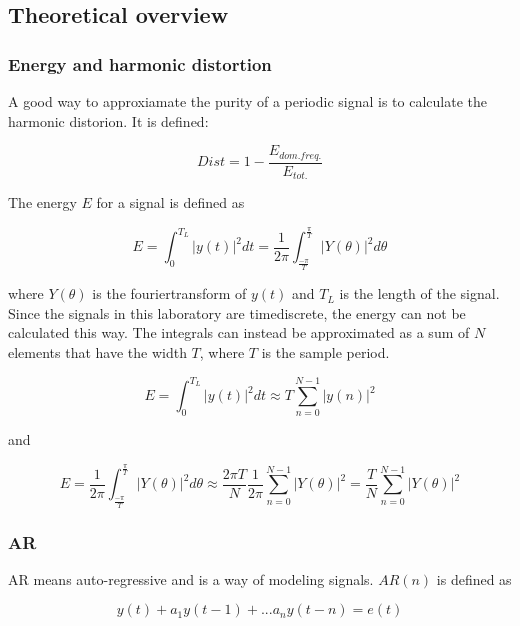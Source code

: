 \documentclass[12pt]{article}
\begin{document}
\subsection{Theoretical overview}

\subsubsection{Energy and harmonic distortion}
A good way to approxiamate the purity of a periodic signal is to calculate the harmonic distorion. It is defined:

\begin{equation}Dist = 1-\frac{E_{dom. freq.}}{E_{tot.}}\end{equation}

The energy $E$ for a signal is defined as

\begin{equation}E=\int_{0}^{T_{L}} \vert y(t)\vert ^2 dt=\frac{1}{2\pi}\int_{\frac{-\pi}{T}}^{\frac{\pi}{T}}\vert Y(\theta)\vert ^2d\theta \end{equation}

where $Y(\theta)$ is the fouriertransform of $y(t)$ and $T_L$ is the length of the signal. Since the signals in this laboratory are timediscrete, the energy can not be calculated this way. The integrals can instead be approximated as a sum of $N$ elements that have the width $T$, where $T$ is the sample period.

\begin{equation}
E=\int_{0}^{T_{L}} \vert y(t)\vert^2 dt\approx T\sum_{n=0}^{N-1}\vert y(n) \vert^2 
\label{A} 
\end{equation}

and

\begin{equation}
E=\frac{1}{2\pi}\int_{\frac{-\pi}{T}}^{\frac{\pi}{T}}\vert Y(\theta)\vert ^2d\theta \approx \frac{2\pi T}{N}\frac{1}{2\pi}\sum_{n=0}^{N-1}\vert Y(\theta) \vert^2=\frac{T}{N}\sum_{n=0}^{N-1}\vert Y(\theta) \vert^2 
\end{equation}

\subsubsection{AR}
\label{ar} 
AR means auto-regressive and is a way of modeling signals. $AR(n)$ is defined as

\begin{equation} 
y(t)+a_1y(t-1)+...a_ny(t-n)=e(t) 
\end{equation}
\end{document}
